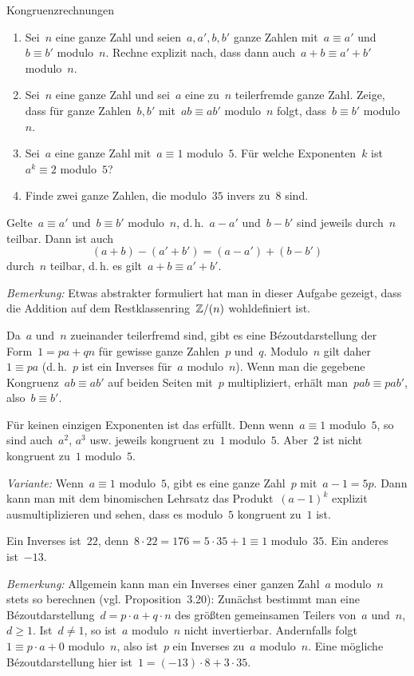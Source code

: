 \documentclass{algblatt}
\begin{document}
\begin{aufgabe}{Kongruenzrechnungen}
\begin{enumerate}
\item Sei~$n$ eine ganze Zahl und seien~$a,a', b,b'$ ganze Zahlen mit~$a \equiv
a'$ und~$b \equiv b'$ modulo~$n$. Rechne explizit nach, dass dann auch~$a+b
\equiv a'+b'$ modulo~$n$.
\item Sei~$n$ eine ganze Zahl und sei~$a$ eine zu~$n$ teilerfremde ganze Zahl.
Zeige, dass für ganze Zahlen~$b, b'$ mit~$a b \equiv a b'$ modulo~$n$
folgt, dass~$b \equiv b'$ modulo~$n$.
\item Sei~$a$ eine ganze Zahl mit~$a \equiv 1$ modulo~$5$. Für welche
Exponenten~$k$ ist~$a^k \equiv 2$ modulo~$5$?
\item Finde zwei ganze Zahlen, die modulo~$35$ invers zu~$8$ sind.
\end{enumerate}

\begin{loesungE}
\item Gelte~$a \equiv a'$ und~$b \equiv b'$ modulo~$n$, d.\,h.~$a - a'$ und~$b
- b'$ sind jeweils durch~$n$ teilbar. Dann ist auch
\[ (a+b) - (a'+b') = (a-a') + (b-b') \]
durch~$n$ teilbar, d.\,h. es gilt~$a+b \equiv a'+b'$.

\emph{Bemerkung:} Etwas abstrakter formuliert hat man in dieser Aufgabe
gezeigt, dass die Addition auf dem Restklassenring~$\mathbb{Z}/(n)$ wohldefiniert ist.

\item Da~$a$ und~$n$ zueinander teilerfremd sind, gibt es eine
Bézoutdarstellung der Form~$1 = pa + qn$ für gewisse ganze Zahlen~$p$ und~$q$.
Modulo~$n$ gilt daher~$1 \equiv p a$ (d.\,h.~$p$ ist ein Inverses für~$a$
modulo~$n$). Wenn man die gegebene Kongruenz~$ab \equiv ab'$ auf beiden Seiten
mit~$p$ multipliziert, erhält man~$pab \equiv pab'$, also~$b \equiv b'$.

\item Für keinen einzigen Exponenten ist das erfüllt. Denn wenn~$a \equiv 1$
modulo~$5$, so sind auch~$a^2$, $a^3$ usw. jeweils kongruent zu~$1$ modulo~$5$.
Aber~$2$ ist nicht kongruent zu~$1$ modulo~$5$.

\emph{Variante:} Wenn~$a \equiv 1$ modulo~$5$, gibt es eine ganze Zahl~$p$
mit~$a - 1 = 5p$. Dann kann man mit dem binomischen Lehrsatz das
Produkt~$(a-1)^k$ explizit ausmultiplizieren und sehen, dass es modulo~$5$
kongruent zu~$1$ ist.

\item Ein Inverses ist~$22$, denn~$8 \cdot 22 = 176 = 5 \cdot 35 + 1 \equiv 1$
modulo~$35$. Ein anderes ist~$-13$.

\emph{Bemerkung:} Allgemein kann man ein Inverses einer ganzen Zahl~$a$
modulo~$n$ stets so berechnen (vgl. Proposition~3.20): Zunächst bestimmt man
eine Bézoutdarstellung~$d = p \cdot a + q \cdot n$ des größten gemeinsamen
Teilers von~$a$ und~$n$, $d \geq 1$. Ist~$d \neq 1$, so ist~$a$ modulo~$n$
nicht invertierbar. Andernfalls folgt~$1 \equiv p \cdot a + 0$ modulo~$n$, also
ist~$p$ ein Inverses zu~$a$ modulo~$n$. Eine mögliche Bézoutdarstellung hier
ist~$1 = (-13) \cdot 8 + 3 \cdot 35$.
\end{loesungE}
\end{aufgabe}
\end{document}
